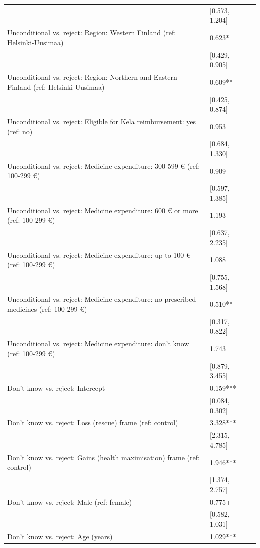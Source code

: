 \begin{tabular}{lll}
& [\num{0.573}, \num{1.204}] &  \\
Unconditional vs. reject: Region: Western Finland (ref: Helsinki-Uusimaa) & \num{0.623}* &  \\
& [\num{0.429}, \num{0.905}] &  \\
Unconditional vs. reject: Region: Northern and Eastern Finland (ref: Helsinki-Uusimaa) & \num{0.609}** &  \\
& [\num{0.425}, \num{0.874}] &  \\
Unconditional vs. reject: Eligible for Kela reimbursement: yes (ref: no) & \num{0.953} &  \\
& [\num{0.684}, \num{1.330}] &  \\
Unconditional vs. reject: Medicine expenditure: 300-599 € (ref: 100-299 €) & \num{0.909} &  \\
& [\num{0.597}, \num{1.385}] &  \\
Unconditional vs. reject: Medicine expenditure: 600 € or more (ref: 100-299 €) & \num{1.193} &  \\
& [\num{0.637}, \num{2.235}] &  \\
Unconditional vs. reject: Medicine expenditure: up to 100 € (ref: 100-299 €) & \num{1.088} &  \\
& [\num{0.755}, \num{1.568}] &  \\
Unconditional vs. reject: Medicine expenditure: no prescribed medicines (ref: 100-299 €) & \num{0.510}** &  \\
& [\num{0.317}, \num{0.822}] &  \\
Unconditional vs. reject: Medicine expenditure: don't know (ref: 100-299 €) & \num{1.743} &  \\
& [\num{0.879}, \num{3.455}] &  \\
Don't know vs. reject: Intercept & \num{0.159}*** &  \\
& [\num{0.084}, \num{0.302}] &  \\
Don't know vs. reject: Loss (rescue) frame (ref: control) & \num{3.328}*** &  \\
& [\num{2.315}, \num{4.785}] &  \\
Don't know vs. reject: Gains (health maximisation) frame (ref: control) & \num{1.946}*** &  \\
& [\num{1.374}, \num{2.757}] &  \\
Don't know vs. reject: Male (ref: female) & \num{0.775}+ &  \\
& [\num{0.582}, \num{1.031}] &  \\
Don't know vs. reject: Age (years) & \num{1.029}*** &  \\

\end{tabular}
